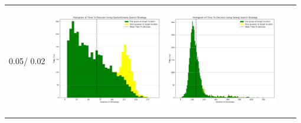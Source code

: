 \begin{landscape}
\begin{table}[h!]
\begin{tabular}{ | m{8mm} | c | c | c | c |}
    0.05/ 0.02 &
    \begin{minipage}[c][48mm][c]{48mm}
      \includegraphics[width=48mm, height=48mm]{Chapters/MultiAgentTargetDetection/Figs/Histograms/MiscalibratedSensor/05-02/05-02EpsilonGreedyHistogram.png}
    \end{minipage}
    &
    \begin{minipage}[c][48mm][c]{48mm}
      \includegraphics[width=48mm, height=48mm]{Chapters/MultiAgentTargetDetection/Figs/Histograms/MiscalibratedSensor/05-02/05-02SweepHistogram.png}


\end{minipage}
\end{tabular}
\end{table}
\end{landscape}
